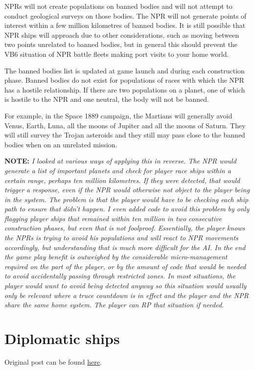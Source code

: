 \documentclass[../Aurora C# unofficial manual.tex]{subfiles}
\begin{document}
	NPRs will not create populations on banned bodies and will not attempt to conduct geological surveys on those bodies. The NPR will not generate points of interest within a few million kilometres of banned bodies. It is still possible that NPR ships will approach due to other considerations, such as moving between two points unrelated to banned bodies, but in general this should prevent the VB6 situation of NPR battle fleets making port visits to your home world.
	
	The banned bodies list is updated at game launch and during each construction phase. Banned bodies do not exist for populations of races with which the NPR has a hostile relationship. If there are two populations on a planet, one of which is hostile to the NPR and one neutral, the body will not be banned.
	
	For example, in the Space 1889 campaign, the Martians will generally avoid Venus, Earth, Luna, all the moons of Jupiter and all the moons of Saturn. They will still survey the Trojan asteroids and they still may pass close to the banned bodies when on an unrelated mission.
	
	\textbf{NOTE:} \textit{I looked at various ways of applying this in reverse. The NPR would generate a list of important planets and check for player race ships within a certain range, perhaps ten million kilometres. If they were detected, that would trigger a response, even if the NPR would otherwise not object to the player being in the system. The problem is that the player would have to be checking each ship path to ensure that didn't happen. I even added code to avoid this problem by only flagging player ships that remained within ten million in two consecutive construction phases, but even that is not foolproof. Essentially, the player knows the NPRs is trying to avoid his populations and will react to NPR movements accordingly, but understanding that is much more difficult for the AI. In the end the game play benefit is outweighed by the considerable micro-management required on the part of the player, or by the amount of code that would be needed to avoid accidentally passing through restricted zones. In most situations, the player would want to avoid being detected anyway so this situation would usually only be relevant where a truce countdown is in effect and the player and the NPR share the same home system. The player can RP that situation if needed.}
	\section{Diplomatic ships}\label{8_diplomatic_ships}
	Original post can be found
	\href{http://aurora2.pentarch.org/index.php?topic=8495.msg120024#msg120024}{here}.
	\newline\newline
	
\end{document}
